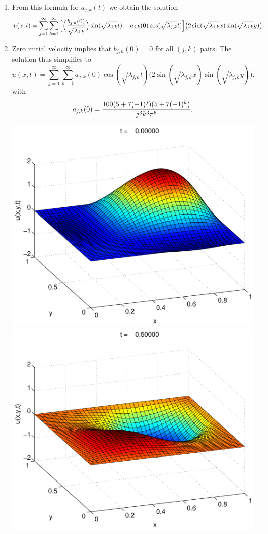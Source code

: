 {\begin{solution}
\begin{enumerate}
\item From this formula for $a_{j,k}(t)$ we obtain the solution
\[ u(x,t) = \sum_{j=1}^\infty \sum_{k=1}^\infty
                 \Big[\Big({b_{j,k}(0) \over \sqrt{\lambda_{j,k}}}\Big)
                   \sin(\sqrt{\lambda_{j,k}} t) + a_{j,k}(0) \cos(\sqrt{\lambda_{j,k}} t)\Big]
                    \big(2 \sin(\sqrt{\lambda_{j,k}} x)\sin(\sqrt{\lambda_{j,k}} y)\big).\]

\item Zero initial velocity implies that $b_{j,k}(0) = 0$ for all $(j,k)$ pairs.
      The solution thus simplifies to
\[ u(x,t) = \sum_{j=1}^\infty \sum_{k=1}^\infty
                   a_{j,k}(0) \cos(\sqrt{\lambda_{j,k}} t)
                    \big(2 \sin(\sqrt{\lambda_{j,k}} x)\sin(\sqrt{\lambda_{j,k}} y)\big).\]
      with 
      \[ a_{j,k}(0) = {100 (5+7(-1)^j)(5+7(-1)^k)\over j^3 k^3 \pi^6}.\]

\begin{center}
\includegraphics[scale=0.37]{wave2d_1} \quad
\includegraphics[scale=0.37]{wave2d_2} 


\end{center}
\end{enumerate}
\end{solution}}
